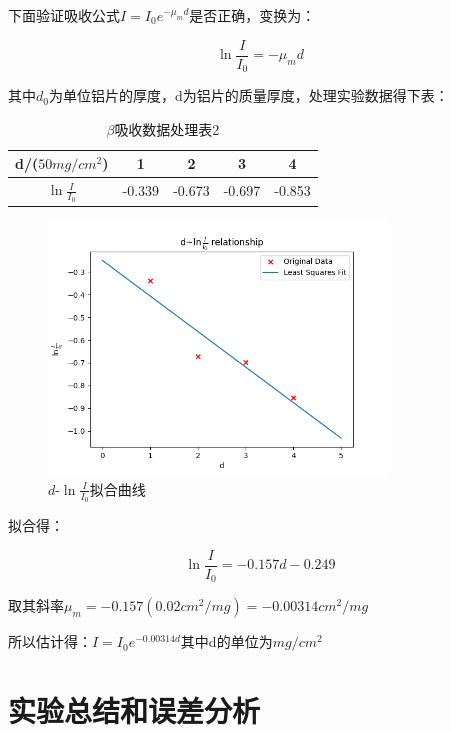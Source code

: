 \documentclass[a4paper,UTF8]{ctexart}
\begin{document}
下面验证吸收公式$I = I_{0} e^{-\mu_{m}d}$是否正确，变换为：

\begin{equation}
    \ln{\frac{I}{I_0}} = -\mu_{m} d 
\end{equation}

其中$d_0$为单位铝片的厚度，d为铝片的质量厚度，处理实验数据得下表：

\begin{table}[H]
    \centering
    \begin{tabular}{|c|c|c|c|c|}
    \hline
        d/($50mg/cm^2$) & 1 & 2 & 3 & 4 \\ \hline
        $\ln{\frac{I}{I_0}}$ & -0.339 & -0.673 & -0.697 & -0.853 \\ \hline
    \end{tabular}
    \caption{$\beta$吸收数据处理表2}
\end{table}

\begin{figure}[H]
    \centering
    \begin{minipage}[b]{0.9\textwidth}
        \centering
        \includegraphics[width=0.8\textwidth]{./fit.png}
        \caption{$d$-$\ln{\frac{I}{I_0}}$拟合曲线}
    \end{minipage}
\end{figure}

拟合得：

\begin{equation}
    \ln{\frac{I}{I_0}} = -0.157 d - 0.249
\end{equation}

取其斜率$\mu_m = -0.157 (0.02cm^2/mg) = -0.00314 cm^2/mg$

所以估计得：$I = I_0 e^{-0.00314d}$其中d的单位为$mg/cm^2$

\section{实验总结和误差分析}
\end{document}
